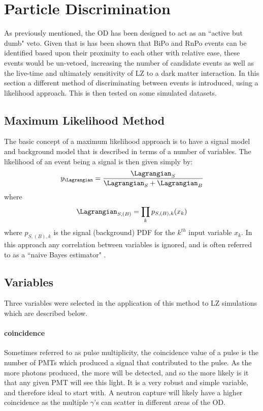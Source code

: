 \section{Particle Discrimination}
\par
As previously mentioned, the OD has been designed to act as an ``active but dumb" veto.
Given that is has been shown that BiPo and RnPo events can be identified based upon their proximity to each other with relative ease, these events would be un-vetoed, increasing the number of candidate events as well as the live-time and ultimately sensitivity of LZ to a dark matter interaction.
In this section a different method of discriminating between events is introduced, using a likelihood approach.
This is then tested on some simulated datasets.

\subsection{Maximum Likelihood Method}
\par
The basic concept of a maximum likelihood approach is to have a signal model and background model that is described in terms of a number of variables.
The likelihood of an event being a signal is then given simply by:
\begin{equation}
    y_{\Lagrangian} = \frac{\Lagrangian_{S}}{\Lagrangian_{S} + \Lagrangian_{B}}
\end{equation}
where 
\begin{equation}
    \Lagrangian_{S,(B)} = \prod_k p_{S,(B),k}(x_k)
\end{equation}
where $p_{S,(B),k}$ is the signal (background) PDF for the $k^{th}$ input variable $x_k$.
In this approach any correlation between variables is ignored, and is often referred to as a ``naive Bayes estimator" \cite{TMVA_ref}.


\subsection{Variables}
\par
Three variables were selected in the application of this method to LZ simulations which are described below.



\paragraph{coincidence}
Sometimes referred to as pulse multiplicity, the coincidence value of a pulse is the number of PMTs which produced a signal that contributed to the pulse.
As the more photons produced, the more will be detected, and so the more likely is it that any given PMT will see this light.
It is a very robust and simple variable, and therefore ideal to start with.
A neutron capture will likely have a higher coincidence as the multiple $\gamma$'s can scatter in different areas of the OD.



